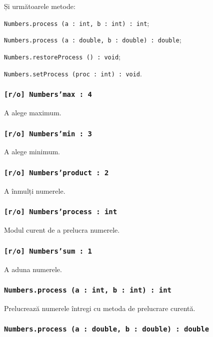 Și următoarele metode:
\begin{icItems}
	\item \texttt{Numbers.process (a : int, b : int) : int};
	\item \texttt{Numbers.process (a : double, b : double) : double};
	\item \texttt{Numbers.restoreProcess () : void};
	\item \texttt{Numbers.setProcess (proc : int) : void}.
\end{icItems}

\subsubsection{\texttt{[r/o] Numbers'max : 4}}

A alege maximum.

\subsubsection{\texttt{[r/o] Numbers'min : 3}}

A alege minimum.

\subsubsection{\texttt{[r/o] Numbers'product : 2}}

A înmulți numerele.

\subsubsection{\texttt{[r/o] Numbers'process : int}}

Modul curent de a prelucra numerele.

\subsubsection{\texttt{[r/o] Numbers'sum : 1}}

A aduna numerele.

\subsubsection{\texttt{Numbers.process (a : int, b : int) : int}}

Prelucrează numerele întregi cu metoda de prelucrare curentă.

\subsubsection{\texttt{Numbers.process (a : double, b : double) : double}}

